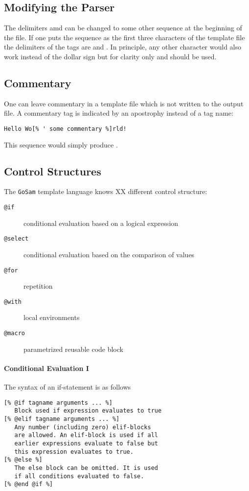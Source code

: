 \documentclass[11pt,a4paper]{refrep}
\newcommand{\golem}{{\tt GoSam}\xspace}
\begin{document}
\subsection{Modifying the Parser}
The delimiters \lit{[\%} amd \lit{\%]} can be changed to some other
sequence at the beginning of the file. If one puts the sequence
\lit{\%=\$} as the first three characters of the template file
the delimiters of the tags are \lit{[\$]} and \lit{\$]}.
In principle, any other character would also work instead of the dollar
sign but for clarity only \lit{\%} and \lit{\$} should be used.

\subsection{Commentary}
One can leave commentary in a template file which is not written to the
output file. A commentary tag is indicated by an apostrophy instead of
a tag name:
\begin{lstlisting}[language=gosamt]
Hello Wo[% ' some commentary %]rld!
\end{lstlisting}
This sequence would simply produce .

\subsection{Control Structures}
The \golem{} template language knows XX different control structure:
\begin{description}
\item[\texttt{@if}] conditional evaluation based on a logical expression
\item[\texttt{@select}] conditional evaluation based on the comparison
    of values
\item[\texttt{@for}] repetition
\item[\texttt{@with}] local environments
\item[\texttt{@macro}] parametrized reusable code block
\end{description}

\paragraph{Conditional Evaluation I}
The syntax of an if-statement is as follows
\begin{lstlisting}[language=gosamt]
[% @if tagname arguments ... %]
   Block used if expression evaluates to true
[% @elif tagname arguments ... %]
   Any number (including zero) elif-blocks
   are allowed. An elif-block is used if all
   earlier expressions evaluate to false but
   this expression evaluates to true.
[% @else %]
   The else block can be omitted. It is used
   if all conditions evaluated to false.
[% @end @if %]
\end{lstlisting}
\end{document}
